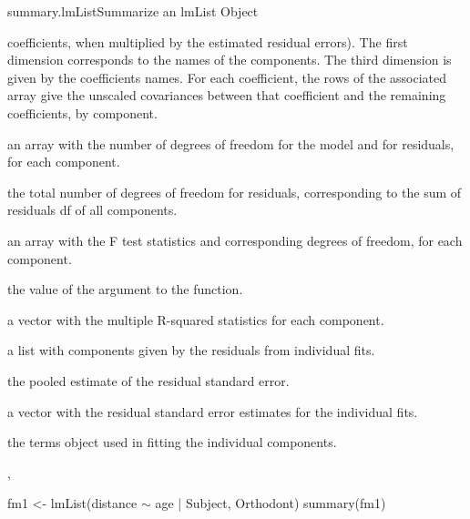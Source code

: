 \documentclass[pdftex]{article} \usepackage{url,graphicx}
\renewcommand{\Twiddle}{\mbox{\(\sim\)}}
\begin{document}
\begin{Helpfile}{summary.lmList}{Summarize an lmList Object}
\begin{Argument}{}
coefficients, when multiplied by the estimated residual errors). The
first dimension corresponds to the names of the 
components. The third dimension is given by the
coefficients names. For each coefficient, the rows of the associated
array give the unscaled covariances between that coefficient and the
remaining coefficients, by  component.
\item[\Co{df:}]
an array with the number of degrees of freedom for the model
and for residuals, for each  component.
\item[\Co{df.residual:}]
the total number of degrees of freedom for
residuals, corresponding to the sum of residuals df of all 
components.
\item[\Co{fstatistics:}]
an array with the F test statistics and
corresponding degrees of freedom, for each  component.
\item[\Co{pool:}]
the value of the  argument to the function.
\item[\Co{r.squared:}]
a vector with the multiple R-squared statistics for
each  component.
\item[\Co{residuals:}]
a list with components given by the residuals from
individual  fits.
\item[\Co{RSE:}]
the pooled estimate of the residual standard error.
\item[\Co{sigma:}]
a vector with the residual standard error estimates for
the individual  fits.
\item[\Co{terms:}]
the terms object used in fitting the individual 
components.
\end{Argument}
, 
\need 15pt
\vspace{-16pt}
\begin{Example}
fm1 <- lmList(distance {\Twiddle} age | Subject, Orthodont)
summary(fm1)
\end{Example}
\end{Helpfile}
\end{document}
